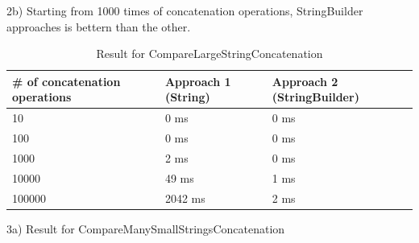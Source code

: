 \documentclass[a4paper]{article}
\begin{document}
2b) Starting from 1000 times of concatenation operations, StringBuilder approaches is bettern than the other.

\begin{table}[htbp]
\begin{tabular}{|l|l|l|}
\hline
\# of concatenation operations & Approach 1 (String) & Approach 2 (StringBuilder) \\ \hline
10                             & 0 ms                & 0 ms                       \\ \hline
100                            & 0 ms                & 0 ms                       \\ \hline
1000                           & 2 ms                & 0 ms                       \\ \hline
10000                          & 49 ms               & 1 ms                       \\ \hline
100000                         & 2042 ms             & 2 ms                       \\ \hline
\end{tabular} 
\captionsetup{justification=centering}
\caption*{Result for CompareLargeStringConcatenation}
\end{table}

3a) Result for CompareManySmallStringsConcatenation
\end{document}
